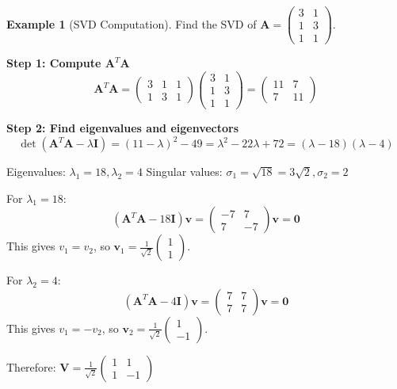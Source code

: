 \documentclass[12pt]{article}
\numberwithin{equation}{section}
\newcommand{\vect}[1]{\boldsymbol{#1}}   %
\newcommand{\mat}[1]{\mathbf{#1}}        %
\theoremstyle{plain}
\theoremstyle{definition}
\newtheorem{example}[theorem]{Example}
\theoremstyle{remark}
\begin{document}
\begin{example}[SVD Computation]
Find the SVD of $\mat{A} = \begin{pmatrix} 3 & 1 \\ 1 & 3 \\ 1 & 1 \end{pmatrix}$.

\textbf{Step 1: Compute $\mat{A}^T\mat{A}$}
$$\mat{A}^T\mat{A} = \begin{pmatrix} 3 & 1 & 1 \\ 1 & 3 & 1 \end{pmatrix}\begin{pmatrix} 3 & 1 \\ 1 & 3 \\ 1 & 1 \end{pmatrix} = \begin{pmatrix} 11 & 7 \\ 7 & 11 \end{pmatrix}$$

\textbf{Step 2: Find eigenvalues and eigenvectors}
$$\det(\mat{A}^T\mat{A} - \lambda\mat{I}) = (11-\lambda)^2 - 49 = \lambda^2 - 22\lambda + 72 = (\lambda-18)(\lambda-4)$$

Eigenvalues: $\lambda_1 = 18, \lambda_2 = 4$
Singular values: $\sigma_1 = \sqrt{18} = 3\sqrt{2}, \sigma_2 = 2$

For $\lambda_1 = 18$:
$$(\mat{A}^T\mat{A} - 18\mat{I})\vect{v} = \begin{pmatrix} -7 & 7 \\ 7 & -7 \end{pmatrix}\vect{v} = \vect{0}$$
This gives $v_1 = v_2$, so $\vect{v}_1 = \frac{1}{\sqrt{2}}\begin{pmatrix} 1 \\ 1 \end{pmatrix}$.

For $\lambda_2 = 4$:
$$(\mat{A}^T\mat{A} - 4\mat{I})\vect{v} = \begin{pmatrix} 7 & 7 \\ 7 & 7 \end{pmatrix}\vect{v} = \vect{0}$$
This gives $v_1 = -v_2$, so $\vect{v}_2 = \frac{1}{\sqrt{2}}\begin{pmatrix} 1 \\ -1 \end{pmatrix}$.

Therefore: $\mat{V} = \frac{1}{\sqrt{2}}\begin{pmatrix} 1 & 1 \\ 1 & -1 \end{pmatrix}$


\end{example}
\end{document}

